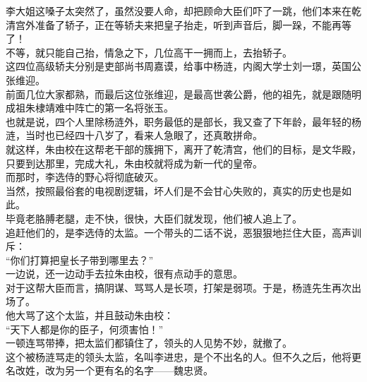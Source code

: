 \begin{multicols}{\theparacolNo}
李大姐这嗓子太突然了，虽然没要人命，却把顾命大臣们吓了一跳，他们本来在乾清宫外准备了轿子，正在等轿夫来把皇子抬走，听到声音后，脚一跺，不能再等了！\\

不等，就只能自己抬，情急之下，几位高干一拥而上，去抬轿子。\\

这四位高级轿夫分别是吏部尚书周嘉谟，给事中杨涟，内阁大学士刘一璟，英国公张维迎。\\

前面几位大家都熟，而最后这位张维迎，是最高世袭公爵，他的祖先，就是跟随明成祖朱棣靖难中阵亡的第一名将张玉。\\

也就是说，四个人里除杨涟外，职务最低的是部长，我又查了下年龄，最年轻的杨涟，当时也已经四十八岁了，看来人急眼了，还真敢拼命。\\

就这样，朱由校在这帮老干部的簇拥下，离开了乾清宫，他们的目标，是文华殿，只要到达那里，完成大礼，朱由校就将成为新一代的皇帝。\\

而那时，李选侍的野心将彻底破灭。\\

当然，按照最俗套的电视剧逻辑，坏人们是不会甘心失败的，真实的历史也是如此。\\

毕竟老胳膊老腿，走不快，很快，大臣们就发现，他们被人追上了。\\

追赶他们的，是李选侍的太监。一个带头的二话不说，恶狠狠地拦住大臣，高声训斥：\\

“你们打算把皇长子带到哪里去？”\\

一边说，还一边动手去拉朱由校，很有点动手的意思。\\

对于这帮大臣而言，搞阴谋、骂骂人是长项，打架是弱项。于是，杨涟先生再次出场了。\\

他大骂了这个太监，并且鼓动朱由校：\\

“天下人都是你的臣子，何须害怕！”\\

一顿连骂带捧，把太监们都镇住了，领头的人见势不妙，就撤了。\\

这个被杨涟骂走的领头太监，名叫李进忠，是个不出名的人。但不久之后，他将更名改姓，改为另一个更有名的名字——魏忠贤。\\


\end{multicols}
